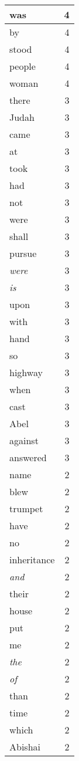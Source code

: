 \begin{center}
\begin{longtable}{l|r}
was & 4 \\ \hline
by & 4 \\ \hline
stood & 4 \\ \hline
people & 4 \\ \hline
woman & 4 \\ \hline
there & 3 \\ \hline
Judah & 3 \\ \hline
came & 3 \\ \hline
at & 3 \\ \hline
took & 3 \\ \hline
had & 3 \\ \hline
not & 3 \\ \hline
were & 3 \\ \hline
shall & 3 \\ \hline
pursue & 3 \\ \hline
\emph{were} & 3 \\ \hline
\emph{is} & 3 \\ \hline
upon & 3 \\ \hline
with & 3 \\ \hline
hand & 3 \\ \hline
so & 3 \\ \hline
highway & 3 \\ \hline
when & 3 \\ \hline
cast & 3 \\ \hline
Abel & 3 \\ \hline
against & 3 \\ \hline
answered & 3 \\ \hline
name & 2 \\ \hline
blew & 2 \\ \hline
trumpet & 2 \\ \hline
have & 2 \\ \hline
no & 2 \\ \hline
inheritance & 2 \\ \hline
\emph{and} & 2 \\ \hline
their & 2 \\ \hline
house & 2 \\ \hline
put & 2 \\ \hline
me & 2 \\ \hline
\emph{the} & 2 \\ \hline
\emph{of} & 2 \\ \hline
than & 2 \\ \hline
time & 2 \\ \hline
which & 2 \\ \hline
Abishai & 2 \\ \hline

\end{longtable}
\end{center}
